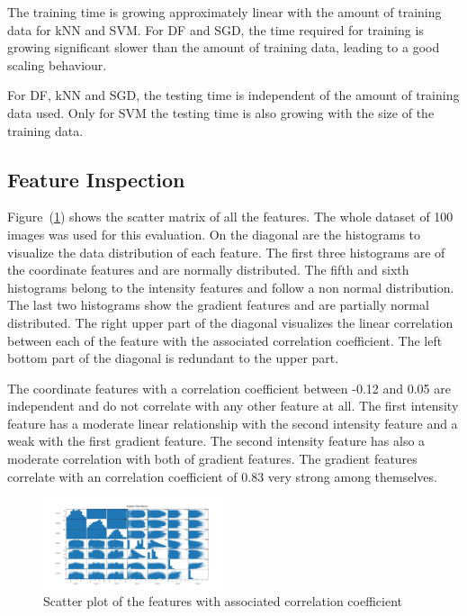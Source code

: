 \documentclass[journal]{IEEEtran}
\begin{document}
The training time is growing approximately linear with the amount of training data for kNN and SVM. For DF and SGD, the time required for training is growing significant slower than the amount of training data, leading to a good scaling behaviour.

For DF, kNN and SGD, the testing time is independent of the amount of training data used. Only for SVM the testing time is also growing with the size of the training data.

\subsection{Feature Inspection}


Figure~(\ref{scatterplot}) shows the scatter matrix of all the features. The whole dataset of 100 images was used for this evaluation. On the diagonal are the histograms to visualize the data distribution of each feature. The first three histograms are of the coordinate features and are normally distributed. The fifth and sixth histograms belong to the intensity features and follow a non normal distribution. The last two histograms show the gradient features and are partially normal distributed. The right upper part of the diagonal visualizes the linear correlation between each of the feature with the associated correlation coefficient. The left bottom part of the diagonal is redundant to the upper part. 

The coordinate features with a correlation coefficient between -0.12 and 0.05 are independent and do not correlate with any other feature at all. The first intensity feature has a moderate linear relationship with the second intensity feature and a weak with the first gradient feature. The second intensity feature has also a moderate correlation with both of gradient features. The gradient features correlate with an correlation coefficient of 0.83 very strong among themselves.

\begin{figure}[h]
	\centering
	\includegraphics[width=0.48\textwidth]{images/ScatterPlotMatrix}
	\caption{Scatter plot of the features with associated correlation coefficient}
	\label{scatterplot}
\end{figure}
\end{document}
